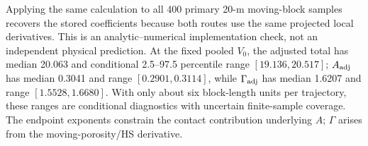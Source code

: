 Applying the same calculation to all 400 primary 20-m moving-block samples
recovers the stored coefficients because both routes use the same projected
local derivatives.  This is an analytic--numerical implementation check, not
an independent physical prediction.  At the fixed pooled $V_0$, the adjusted
total has median 20.063 and conditional 2.5--97.5 percentile range
$[19.136,20.517]$; $A_{\rm adj}$ has median 0.3041 and range
$[0.2901,0.3114]$, while $\Gamma_{\rm adj}$ has median 1.6207 and range
$[1.5528,1.6680]$.  With only about six block-length units per trajectory,
these ranges are conditional diagnostics with uncertain finite-sample
coverage.  The endpoint exponents constrain the contact contribution
underlying $A$; $\Gamma$ arises from the moving-porosity/HS derivative.
